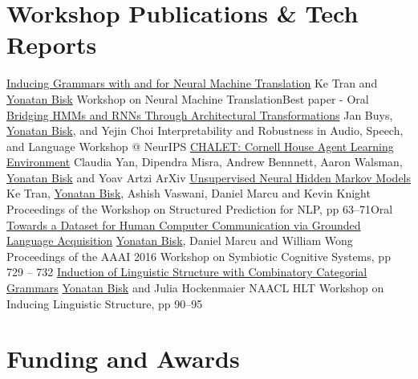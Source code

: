\documentclass[10pt,letter]{moderncv}
\newcommand{\YB}{\underline{Yonatan Bisk}}
\begin{document}
\section{Workshop Publications \& Tech Reports}
  {\href{https://arxiv.org/abs/1805.10850}{Inducing Grammars with and for Neural Machine Translation}}
  {Ke Tran and \YB{}}
  {Workshop on Neural Machine Translation}{Best paper - Oral}{}
\pub{--}
  {\href{https://openreview.net/forum?id=rJxEso0osm}{Bridging HMMs and RNNs Through Architectural Transformations}}
  {Jan Buys, \YB{}, and Yejin Choi}
  {Interpretability and Robustness in Audio, Speech, and Language Workshop @ NeurIPS}{}{}
\pub{--}
  {\href{https://arxiv.org/abs/1801.07357}{CHALET: Cornell House Agent Learning Environment}}
  {Claudia Yan, Dipendra Misra, Andrew Bennnett, Aaron Walsman, \YB{} and Yoav Artzi}
  {ArXiv}{}{}
  {\href{http://yonatanbisk.com/papers/2016-EMNLP-StrcPred.pdf}{Unsupervised Neural Hidden Markov Models}}
  {Ke Tran, \YB{}, Ashish Vaswani, Daniel Marcu and Kevin Knight}
  {Proceedings of the Workshop on Structured Prediction for NLP, pp 63--71}{Oral}{}
\pub{--}
  {\href{http://yonatanbisk.com/papers/2016-AAAI-Wksp.pdf}{Towards a Dataset for Human Computer Communication via Grounded Language Acquisition}}
  {\YB{}, Daniel Marcu and William Wong}
  {Proceedings of the AAAI 2016 Workshop on Symbiotic Cognitive Systems, pp 729 -- 732}{}{}
  {\href{http://yonatanbisk.com/papers/2012-NAACL-WILS.pdf}{Induction of Linguistic Structure with Combinatory Categorial Grammars}}
  {\YB{} and Julia Hockenmaier}
  {NAACL HLT Workshop on Inducing Linguistic Structure, pp 90--95}{}{}


\section{Funding and Awards}
\end{document}
